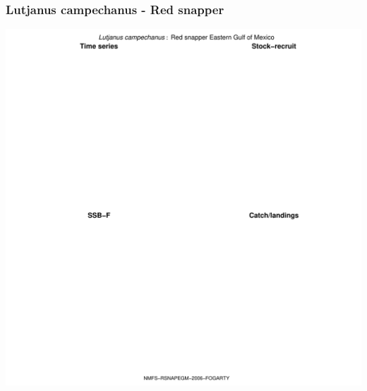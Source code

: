 \subsubsection{Lutjanus campechanus - Red snapper}
\begin{center}
\includegraphics[width=1.2\textwidth]{../R/figures/NMFS-RSNAPEGM-2006-FOGARTY.pdf}
\end{center}


